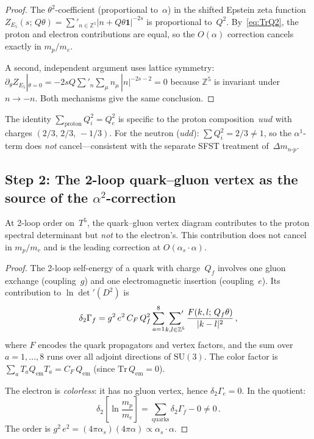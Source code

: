 \begin{proof}
The $\theta^2$-coefficient (proportional to~$\alpha$) in the
shifted Epstein zeta function
$Z_{E_5}(s;\,Q\theta) = \sum'_{n\in\mathbb{Z}^5}|n+Q\theta\mathbf{1}|^{-2s}$
is proportional to~$Q^2$.  By~\eqref{eq:TrQ2}, the proton and
electron contributions are equal, so the $O(\alpha)$ correction
cancels exactly in $m_p/m_e$.

A second, independent argument uses lattice symmetry:
$\partial_\theta Z_{E_5}|_{\theta=0}
= -2sQ\sum'_n \sum_\mu n_\mu\,|n|^{-2s-2} = 0$
because $\mathbb{Z}^5$ is invariant under $n\to -n$.
Both mechanisms give the same conclusion.
\end{proof}

The identity $\sum_{\mathrm{proton}}Q_i^2 = Q_e^2$ is specific to the
proton composition~$uud$ with charges $(2/3,\,2/3,\,-1/3)$.  For the
neutron ($udd$): $\sum Q_i^2 = 2/3 \neq 1$, so the $\alpha^1$-term
does \emph{not} cancel---consistent with the separate SFST treatment
of~$\Delta m_{n\text{-}p}$.

\subsection{Step 2: The 2-loop quark--gluon vertex as the source
  of the $\alpha^2$-correction}
\label{sec:2loop}

\begin{theorem}\label{thm:2loopmech}
At 2-loop order on~$T^5$, the quark--gluon vertex diagram contributes
to the proton spectral determinant but \emph{not} to the electron's.
This contribution does not cancel in $m_p/m_e$ and is the leading
correction at $O(\alpha_s\cdot\alpha)$.
\end{theorem}

\begin{proof}
The 2-loop self-energy of a quark with charge~$Q_f$ involves one
gluon exchange (coupling~$g$) and one electromagnetic insertion
(coupling~$e$).  Its contribution to $\ln\det'(D^2)$ is
\[
  \delta_2\Gamma_f
  = g^2\,e^2\,C_F\,Q_f^2 \sum_{a=1}^{8}
    \sideset{}{'}\sum_{k,l\in\mathbb{Z}^5}
    \frac{F(k,l;\,Q_f\theta)}{|k-l|^2}\,,
\]
where $F$ encodes the quark propagators and vertex factors, and the
sum over $a=1,\ldots,8$ runs over all adjoint directions of
$\mathrm{SU}(3)$.  The color factor is
$\sum_a T_a Q_{\mathrm{em}} T_a = C_F\,Q_{\mathrm{em}}$
(since $\mathrm{Tr}\,Q_{\mathrm{em}}=0$).

The electron is \emph{colorless}: it has no gluon vertex, hence
$\delta_2\Gamma_e = 0$.  In the quotient:
\[
  \delta_2\!\left[\ln\frac{m_p}{m_e}\right]
  = \sum_{\mathrm{quarks}} \delta_2\Gamma_f - 0
  \neq 0\,.
\]
The order is $g^2\,e^2 = (4\pi\alpha_s)(4\pi\alpha)
\propto \alpha_s\cdot\alpha$.
\end{proof}

